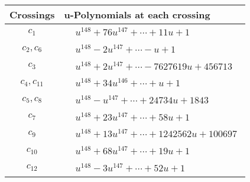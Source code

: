 \documentclass[1p]{elsarticle_modified}
\theoremstyle{definition}
\begin{document}
\begin{tabular}{m{50pt}|m{274pt}}
Crossings & \hspace{64pt}u-Polynomials at each crossing \\
\hline $$\begin{aligned}c_{1}\end{aligned}$$&$\begin{aligned}
&u^{148}+76 u^{147}+\cdots+11 u+1
\end{aligned}$\\
\hline $$\begin{aligned}c_{2},c_{6}\end{aligned}$$&$\begin{aligned}
&u^{148}-2 u^{147}+\cdots- u+1
\end{aligned}$\\
\hline $$\begin{aligned}c_{3}\end{aligned}$$&$\begin{aligned}
&u^{148}+2 u^{147}+\cdots-7627619 u+456713
\end{aligned}$\\
\hline $$\begin{aligned}c_{4},c_{11}\end{aligned}$$&$\begin{aligned}
&u^{148}+34 u^{146}+\cdots+u+1
\end{aligned}$\\
\hline $$\begin{aligned}c_{5},c_{8}\end{aligned}$$&$\begin{aligned}
&u^{148}- u^{147}+\cdots+24734 u+1843
\end{aligned}$\\
\hline $$\begin{aligned}c_{7}\end{aligned}$$&$\begin{aligned}
&u^{148}+23 u^{147}+\cdots+58 u+1
\end{aligned}$\\
\hline $$\begin{aligned}c_{9}\end{aligned}$$&$\begin{aligned}
&u^{148}+13 u^{147}+\cdots+1242562 u+100697
\end{aligned}$\\
\hline $$\begin{aligned}c_{10}\end{aligned}$$&$\begin{aligned}
&u^{148}+68 u^{147}+\cdots+19 u+1
\end{aligned}$\\
\hline $$\begin{aligned}c_{12}\end{aligned}$$&$\begin{aligned}
&u^{148}-3 u^{147}+\cdots+52 u+1
\end{aligned}$\\
\hline
\end{tabular}\\~\\
\end{document}
